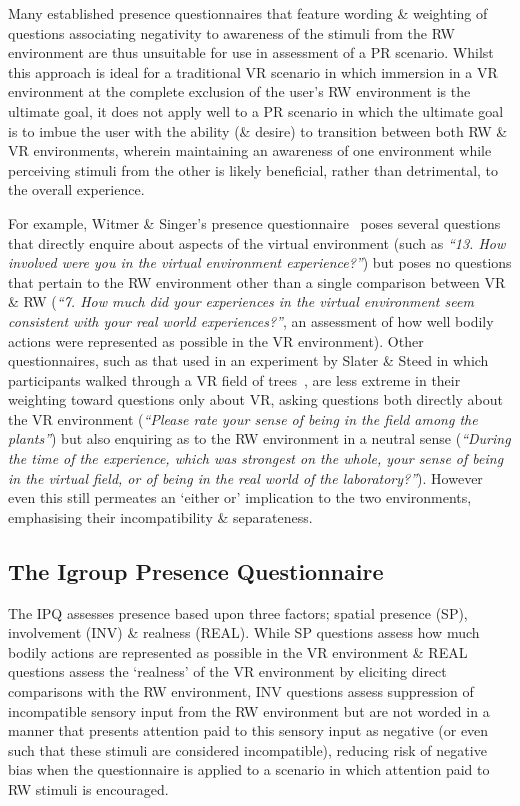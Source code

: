 Many established presence questionnaires that feature wording \& weighting of questions associating negativity to awareness of the stimuli from the RW environment are thus unsuitable for use in assessment of a PR scenario. Whilst this approach is ideal for a traditional VR scenario in which immersion in a VR environment at the complete exclusion of the user's RW environment is the ultimate goal, it does not apply well to a PR scenario in which the ultimate goal is to imbue the user with the ability (\& desire) to transition between both RW \& VR environments, wherein maintaining an awareness of one environment while perceiving stimuli from the other is likely beneficial, rather than detrimental, to the overall experience.

For example, Witmer \& Singer's presence questionnaire~\cite{Witmer1998} poses several questions that directly enquire about aspects of the virtual environment (such as \textit{``13. How involved were you in the virtual environment experience?''}) but poses no questions that pertain to the RW environment other than a single comparison between VR \& RW (\textit{``7. How much did your experiences in the virtual environment seem consistent with your real world experiences?''}, an assessment of how well bodily actions were represented as possible in the VR environment). Other questionnaires, such as that used in an experiment by Slater \& Steed in which participants walked through a VR field of trees~\cite{Slater1998}, are less extreme in their weighting toward questions only about VR, asking questions both directly about the VR environment (\textit{``Please rate your sense of being in the field among the plants''}) but also enquiring as to the RW environment in a neutral sense (\textit{``During the time of the experience, which was strongest on the whole, your sense of being in the virtual field, or of being in the real world of the laboratory?''}). However even this still permeates an `either or' implication to the two environments, emphasising their incompatibility \& separateness.


\subsection{The Igroup Presence Questionnaire}

The IPQ assesses presence based upon three factors; spatial presence (SP), involvement (INV) \& realness (REAL). While SP questions assess how much bodily actions are represented as possible in the VR environment \& REAL questions assess the `realness' of the VR environment by eliciting direct comparisons with the RW environment, INV questions assess suppression of incompatible sensory input from the RW environment but are not worded in a manner that presents attention paid to this sensory input as negative (or even such that these stimuli are considered incompatible), reducing risk of negative bias when the questionnaire is applied to a scenario in which attention paid to RW stimuli is encouraged.

